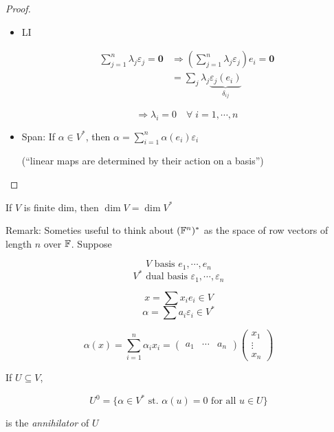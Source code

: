 \documentclass[a4paper]{article}
\begin{document}
\begin{proof}
\begin{itemize}
	\item LI
	
	\begin{align*}
	\sum_{j=1}^{n} \lambda_{j} \varepsilon_{j} = \mathbf{0} & \Rightarrow \left(  \sum_{j=1}^{n}  \lambda_{j} \varepsilon_{j} \right) e_{i} = \mathbf{0}   \\
	& = \sum_{j} \lambda_{j} \underbrace{\varepsilon_{j} (e_{i})}_{\delta_{ij}} 
	\end{align*}
	
	
	\[ \Rightarrow  \lambda_{i} = 0 \quad \forall \; i = 1,\cdots,n \]
	
	\item Span: If $ \alpha \in V^{*} $, then $ \alpha = \sum_{i=1}^{n} \alpha(e_{i}) \varepsilon_{i} $
	
	(``linear maps are determined by their action on a basis'')
	
\end{itemize}
\end{proof}

\begin{cor} 
	If $ V $ is finite dim, then $ \dim V  = \dim V^{*} $
\end{cor}
 
 
 Remark: Someties useful to think about $ (\mathbb{F}^{n})^{*} $ as the space of row vectors of length $ n $ over $ \mathbb{F} $. Suppose
 
 \[ V \text{ basis } e_{1},\cdots,e_{n}\]
 \[ V^{*} \text{ dual basis } \varepsilon_{1},\cdots,\varepsilon_{n} \]
 
\[   x = \sum x_{i} e_{i} \in V \] 
\[ \alpha = \sum a_{i} \varepsilon_{i} \in V^{*}  \]
 
 \[ \alpha(x) = \sum_{i=1}^{n} \alpha_{i} x_{i} =   \begin{pmatrix}
 a_{1} & \cdots & a_{n}
 \end{pmatrix}  \begin{pmatrix}
 x_{1} \\
 \vdots \\
 x_{n}
 \end{pmatrix}  \]
 
 
 \begin{defi}
 	If $ U \subseteq V $, 
 	
 	\[ U^{0} = \{  \alpha \in V^{*} \text{ st. } \alpha(u) = 0 \text{ for all }  u  \in U \} \] 
 	
 	is the \emph{annihilator} of $ U $
 	
 \end{defi}
\end{document}
